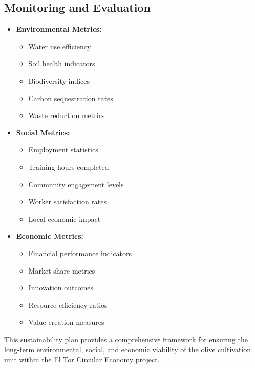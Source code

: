 \subsection{Monitoring and Evaluation}
\begin{itemize}
    \item \textbf{Environmental Metrics:}
    \begin{itemize}
        \item Water use efficiency
        \item Soil health indicators
        \item Biodiversity indices
        \item Carbon sequestration rates
        \item Waste reduction metrics
    \end{itemize}
    
    \item \textbf{Social Metrics:}
    \begin{itemize}
        \item Employment statistics
        \item Training hours completed
        \item Community engagement levels
        \item Worker satisfaction rates
        \item Local economic impact
    \end{itemize}
    
    \item \textbf{Economic Metrics:}
    \begin{itemize}
        \item Financial performance indicators
        \item Market share metrics
        \item Innovation outcomes
        \item Resource efficiency ratios
        \item Value creation measures
    \end{itemize}
\end{itemize}

This sustainability plan provides a comprehensive framework for ensuring the long-term environmental, social, and economic viability of the olive cultivation unit within the El Tor Circular Economy project.
